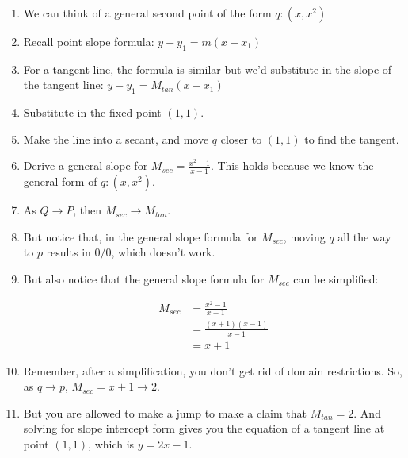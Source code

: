 \documentclass{article}
\begin{document}
\begin{enumerate}
    \item We can think of a general second point of the form $q: (x, x^2)$
    \item Recall point slope formula: $y - y_1 = m(x - x_1)$
    \item For a tangent line, the formula is similar but we'd substitute in the slope of
        the tangent line: $y - y_1 = M_{tan}(x - x_1)$
    \item Substitute in the fixed point $(1, 1)$. 
    \item Make the line into a secant, and move $q$ closer to $(1, 1)$ to find the
        tangent.
    \item Derive a general slope for $M_{sec} = \frac{x^2 - 1}{x - 1}$. This holds because
        we know the general form of $q: (x, x^2)$.
    \item As $Q \rightarrow P$, then $M_{sec} \rightarrow M_{tan}$.
    \item But notice that, in the general slope formula for $M_{sec}$, moving $q$ all the
        way to $p$ results in $0/0$, which doesn't work. 
    \item But also notice that the general slope formula for $M_{sec}$ can be simplified:

        \begin{align*}
            M_{sec} &= \frac{x^2 - 1}{x-1}\\
            &= \frac{(x+1)(x-1)}{x-1}\\
            &= x + 1
        \end{align*}

    \item Remember, after a simplification, you don't get rid of domain restrictions. So,
        as $q \rightarrow p$, $M_{sec} = x + 1 \rightarrow 2$.
    \item But you are allowed to make a jump to make a claim that $M_{tan} = 2$. And
        solving for slope intercept form gives you the equation of a tangent line at point
        $(1, 1)$, which is $y = 2x - 1$.


\end{enumerate}
\end{document}
